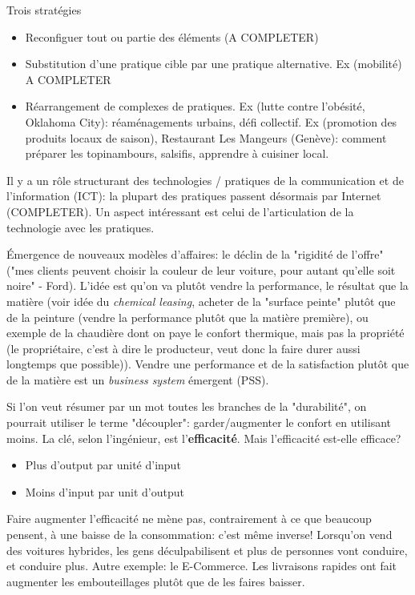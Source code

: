 \documentclass{article}
\begin{document}
 Trois stratégies
 \begin{itemize}
 	\item Reconfiguer tout ou partie des éléments (A COMPLETER)
 	\item Substitution d'une pratique cible par une pratique alternative. Ex (mobilité) A COMPLETER
 	\item Réarrangement de complexes de pratiques. Ex (lutte contre l'obésité, Oklahoma City): réaménagements urbains, défi collectif. Ex (promotion des produits locaux de saison), Restaurant Les Mangeurs (Genève): comment préparer les topinambours, salsifis, apprendre à cuisiner local.
 \end{itemize}
 Il y a un rôle structurant des technologies / pratiques de la communication et de l'information (ICT): la plupart  des pratiques passent désormais par Internet (COMPLETER). Un aspect intéressant est celui de l'articulation de la technologie avec les pratiques. \par
 Émergence de nouveaux modèles d'affaires: le déclin de la "rigidité de l'offre" ("mes clients peuvent choisir la couleur de leur voiture, pour autant qu'elle soit noire" - Ford). L'idée est qu'on va plutôt vendre la performance, le résultat que la matière (voir idée du \emph{chemical leasing}, acheter de la "surface peinte" plutôt que de la peinture (vendre la performance plutôt que la matière première), ou exemple de la chaudière dont on paye le confort thermique, mais pas la propriété (le propriétaire, c'est à dire le producteur, veut donc la faire durer aussi longtemps que possible)). Vendre une performance et de la satisfaction plutôt que de la matière est un \emph{business system} émergent (PSS). \par
 Si l'on veut résumer par un mot toutes les branches de la "durabilité", on pourrait utiliser le terme "découpler": garder/augmenter le confort en utilisant moins. La clé, selon l'ingénieur, est l'\textbf{efficacité}. Mais l'efficacité est-elle efficace?
 \begin{itemize}
 	\item Plus d'output par unité d'input
 	\item Moins d'input par unit d'output
 \end{itemize}
 Faire augmenter l'efficacité ne mène pas, contrairement à ce que beaucoup pensent, à une baisse de la consommation: c'est même inverse! Lorsqu'on vend des voitures hybrides, les gens déculpabilisent et plus de personnes vont conduire, et conduire plus. Autre exemple: le E-Commerce. Les livraisons rapides ont fait augmenter les embouteillages plutôt que de les faires baisser. \par
\end{document}
